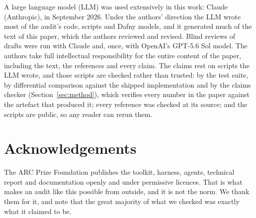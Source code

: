 \documentclass[11pt]{article}
\begin{document}
A large language model (LLM) was used extensively in this work: Claude
(Anthropic), in September 2026. Under the authors' direction the LLM wrote most
of the audit's code, scripts and Dafny models, and it generated much of the text
of this paper, which the authors reviewed and revised. Blind reviews of drafts
were run with Claude and, once, with OpenAI's GPT-5.6 Sol model. The authors
take full intellectual responsibility for the entire content of the paper,
including the text, the references and every claim. The claims rest on scripts
the LLM wrote, and those scripts are checked rather than trusted: by the test
suite, by differential comparison against the shipped implementation
and by the claims checker (Section~\ref{sec:method}), which verifies every
number in the paper against the artefact that produced it; every reference was
checked at its source; and the scripts are public, so any reader can rerun them.

\section*{Acknowledgements}

The ARC Prize Foundation publishes the toolkit, harness, agents, technical
report and documentation openly and under permissive licences. That is what
makes an audit like this possible from outside, and it is not the norm. We thank
them for it, and note that the great majority of what we checked was exactly
what it claimed to be.
\end{document}
